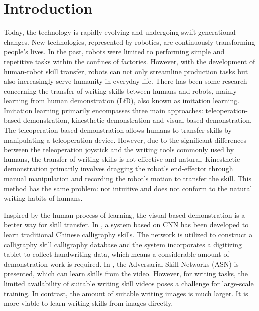 \documentclass[conference]{IEEEtran}
\begin{document}
\section{Introduction}
Today, the technology is rapidly evolving and undergoing swift generational changes. New technologies, represented by robotics, are continuously transforming people's lives. In the past, robots were limited to performing simple and repetitive tasks within the confines of factories. However, with the development of human-robot skill transfer, robots can not only streamline production tasks but also increasingly serve humanity in everyday life. There has been some research concerning the transfer of writing skills between humans and robots, mainly learning from human demonstration (LfD), also known as imitation learning. Imitation learning primarily encompasses three main approaches: teleoperation-based demonstration, kinesthetic demonstration and visual-based demonstration. The teleoperation-based demonstration allows humans to transfer skills by manipulating a teleoperation device\cite{Lu2024}. However, due to the significant differences between the teleoperation joystick and the writing tools commonly used by humans, the transfer of writing skills is not effective and natural. Kinesthetic demonstration primarily involves dragging the robot's end-effector through manual manipulation and recording the robot's motion to transfer the skill\cite{Dong2023a}. This method has the same problem: not intuitive and does not conform to the natural writing habits of humans. 

Inspired by the human process of learning, the visual-based demonstration is a better way for skill transfer. In \cite{Zhang2019}, a system based on CNN has been developed to learn traditional Chinese calligraphy skills. The network is utilized to construct a calligraphy skill calligraphy database and the system incorporates a digitizing tablet to collect handwriting data, which means a considerable amount of demonstration work is required. In \cite{Mees2020}, the Adversarial Skill Networks (ASN) is presented, which can learn skills from the video. However, for writing tasks, the limited availability of suitable writing skill videos poses a challenge for large-scale training. In contrast, the amount of suitable writing images is much larger. It is more viable to learn writing skills from images directly.
\end{document}
